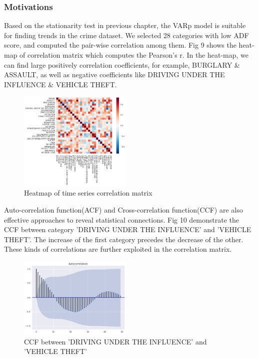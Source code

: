 \documentclass[11pt,conference]{IEEEtran}
\begin{document}
\subsubsection{Motivations}
Based on the stationarity test in previous chapter, the VAR{p} model is suitable for finding trends in the crime dataset. We selected 28 categories with low ADF score, and computed the pair-wise correlation among them. Fig 9 shows the heat-map of correlation matrix which computes the Pearson's r. In the heat-map, we can find large positively correlation coefficients, for example, BURGLARY \& ASSAULT, as well as negative coefficients like DRIVING UNDER THE INFLUENCE \& VEHICLE THEFT.
\begin{figure}[H]
\begin{center}
\includegraphics [width=0.48\textwidth]{pics/heat_map_time_series.png}
\caption{Heatmap of time series correlation matrix }
\end{center}
\end{figure}
Auto-correlation function(ACF) and Cross-correlation function(CCF) are also effective approaches to reveal statistical connections. Fig 10 demonstrate the CCF between category 'DRIVING UNDER THE INFLUENCE' and 'VEHICLE THEFT'. The increase of the first category precedes the decrease of the other. These kinds of correlations are further exploited in the correlation matrix.
\begin{figure}[H]
\begin{center}
\includegraphics [width=0.48\textwidth]{pics/ccf_DRIVING_UNDER_THE_INFLUENCE_VEHICLE_THEFT.png}
\caption{CCF between 'DRIVING UNDER THE INFLUENCE' and 'VEHICLE THEFT'}
\end{center}
\end{figure}
\end{document}
